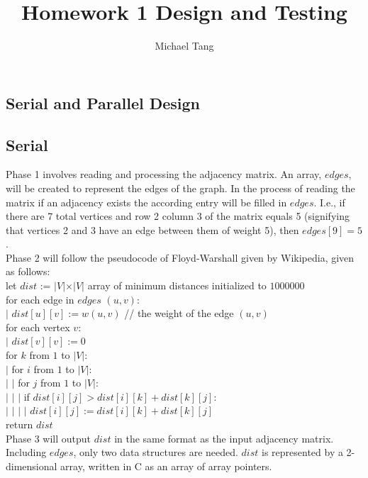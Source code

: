\documentclass{article}
\title{Homework 1 Design and Testing}
\author{Michael Tang}
\begin{document}
\maketitle
{}
\begin{adjustwidth}{-2cm}{-2cm}

\section{Serial and Parallel Design}
\subsection{Serial}
Phase 1 involves reading and processing the adjacency matrix. An array, $edges$, will be created to represent the edges of the graph. In the process of reading the matrix if an adjacency exists the according entry will be filled in $edges$. I.e., if there are 7 total vertices and row 2 column 3 of the matrix equals 5 (signifying that vertices 2 and 3 have an edge between them of weight 5), then $edges[9] = 5$.\\
Phase 2 will follow the pseudocode of Floyd-Warshall given by Wikipedia, given as follows:\\
let $dist$ := $\vert V \vert \times \vert V \vert$ array of minimum distances initialized to $1000000$\\
for each edge in $edges$ $(u,v)$:\\
\null \quad $\vert$ $dist[u][v] := w(u,v)$  // the weight of the edge $(u,v)$\\
for each vertex $v$:\\
\null \quad $\vert$ $dist[v][v] := 0$\\
for $k$ from $1$ to $\vert V \vert$:\\
\null \quad $\vert$ for $i$ from $1$ to $\vert V \vert$:\\
\null \quad $\vert$ \quad $\vert$ for $j$ from $1$ to $\vert V \vert$:\\
\null \quad $\vert$ \quad $\vert$ \quad $\vert$ if $dist[i][j] > dist[i][k] + dist[k][j]$: \\
\null \quad $\vert$ \quad $\vert$ \quad $\vert$ \quad $\vert$ $dist[i][j] := dist[i][k] + dist[k][j]$\\
return $dist$\\
Phase 3 will output $dist$ in the same format as the input adjacency matrix.\\
Including $edges$, only two data structures are needed. $dist$ is represented by a 2-dimensional array, written in C as an array of array pointers.

\end{adjustwidth}
\end{document}

